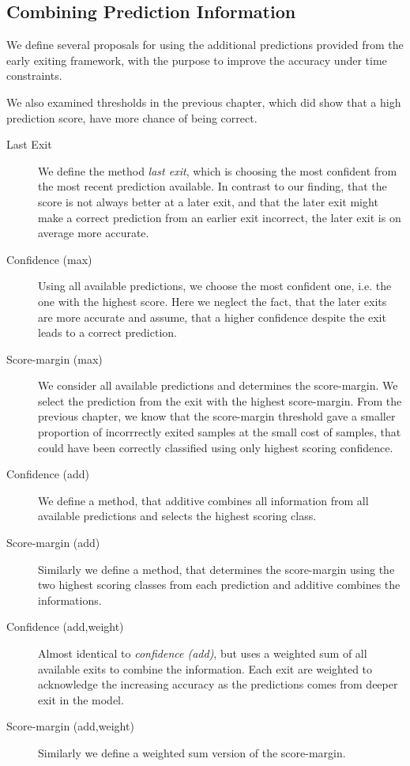 \subsection{Combining Prediction Information}

We define several proposals for using the additional predictions provided from the early exiting framework, with the purpose to improve the accuracy under time constraints. 




We also examined thresholds in the previous chapter, which did show that a high prediction score, have more chance of being correct.       

\begin{description}
	\item[Last Exit] We define the method \emph{last exit}, which is choosing the most confident from the most recent prediction available. In contrast to our finding, that the score is not always better at a later exit, and that the later exit might make a correct prediction from an earlier exit incorrect, the later exit is on average more accurate.
	\item[Confidence (max)] Using all available predictions, we choose the most confident one, i.e. the one with the highest score. Here we neglect the fact, that the later exits are more accurate and assume, that a higher confidence despite the exit leads to a correct prediction.
	\item[Score-margin (max)] We consider all available predictions and determines the score-margin. We select the prediction from the exit with the highest score-margin. From the previous chapter, we know that the score-margin threshold gave a smaller proportion of incorrrectly exited samples at the small cost of samples, that could have been correctly classified using only highest scoring confidence.
	\item[Confidence (add)] We define a method, that additive combines all information from all available predictions and selects the highest scoring class. 
	\item[Score-margin (add)] Similarly we define a method, that determines the score-margin using the two highest scoring classes from each prediction and additive combines the informations.
	\item[Confidence (add,weight)] Almost identical to \emph{confidence (add)}, but uses a weighted sum of all available exits to combine the information. Each exit are weighted to acknowledge the increasing accuracy as the predictions comes from deeper exit in the model.  
	\item[Score-margin (add,weight)] Similarly we define a weighted sum version of the score-margin. 
\end{description}

